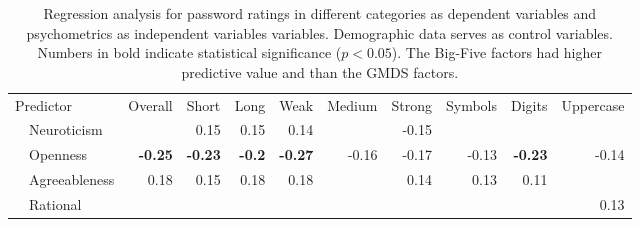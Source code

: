 \begin{table*}%
  \small
  \centering
  \caption{Regression analysis for password ratings in different categories as dependent variables and psychometrics as independent variables variables. Demographic data serves as control variables. Numbers in bold indicate statistical significance ($p<0.05$). The Big-Five factors had higher predictive value and than the GMDS factors.}
    \resizebox{\linewidth}{!}
{
\begin{tabular}{rl|r|rr|rrr|rrr}
    \multicolumn{2}{l|}{Predictor} & \multicolumn{1}{l|}{Overall} & \multicolumn{1}{l}{Short} & \multicolumn{1}{l|}{Long} & \multicolumn{1}{l}{Weak} & \multicolumn{1}{l}{Medium} & \multicolumn{1}{l|}{Strong} & \multicolumn{1}{l}{Symbols} & \multicolumn{1}{l}{Digits} & \multicolumn{1}{l}{Uppercase} \\
\cmidrule{3-11}    \rowcolor[rgb]{ .718,  .871,  .91} \multicolumn{1}{l}{Big Five} & Neuroticism & \cellcolor[rgb]{ 1,  1,  1}  & \cellcolor[rgb]{ .949,  .91,  .518} 0.15 & \cellcolor[rgb]{ .949,  .91,  .518} 0.15 & \cellcolor[rgb]{ .969,  .914,  .518} 0.14 & \cellcolor[rgb]{ 1,  1,  1}  & \cellcolor[rgb]{ .98,  .627,  .459} -0.15 & \cellcolor[rgb]{ 1,  1,  1}  & \cellcolor[rgb]{ 1,  1,  1}  & \cellcolor[rgb]{ 1,  1,  1}  \\
    \rowcolor[rgb]{ .718,  .871,  .91}   & Openness & \cellcolor[rgb]{ .976,  .518,  .439} \textbf{-0.25} & \cellcolor[rgb]{ .976,  .541,  .443} \textbf{-0.23} & \cellcolor[rgb]{ .98,  .573,  .447} \textbf{-0.2} & \cellcolor[rgb]{ .976,  .498,  .435} \textbf{-0.27} & \cellcolor[rgb]{ .98,  .616,  .459} -0.16 & \cellcolor[rgb]{ .98,  .604,  .455} -0.17 & \cellcolor[rgb]{ .984,  .647,  .463} -0.13 & \cellcolor[rgb]{ .976,  .541,  .443} \textbf{-0.23} & \cellcolor[rgb]{ .984,  .639,  .463} -0.14 \\
    \rowcolor[rgb]{ .718,  .871,  .91}   & Agreeableness & \cellcolor[rgb]{ .898,  .894,  .514} 0.18 & \cellcolor[rgb]{ .949,  .91,  .518} 0.15 & \cellcolor[rgb]{ .898,  .894,  .514} 0.18 & \cellcolor[rgb]{ .898,  .894,  .514} 0.18 & \cellcolor[rgb]{ 1,  1,  1}  & \cellcolor[rgb]{ .969,  .914,  .518} 0.14 & \cellcolor[rgb]{ .984,  .918,  .518} 0.13 & \cellcolor[rgb]{ .996,  .91,  .514} 0.11 & \cellcolor[rgb]{ 1,  1,  1}  \\
    \rowcolor[rgb]{ .988,  .835,  .706} \multicolumn{1}{l}{GDMS} & Rational & \cellcolor[rgb]{ 1,  1,  1}  & \cellcolor[rgb]{ 1,  1,  1}  & \cellcolor[rgb]{ 1,  1,  1}  & \cellcolor[rgb]{ 1,  1,  1}  & \cellcolor[rgb]{ 1,  1,  1}  & \cellcolor[rgb]{ 1,  1,  1}  & \cellcolor[rgb]{ 1,  1,  1}  & \cellcolor[rgb]{ 1,  1,  1}  & \cellcolor[rgb]{ .984,  .918,  .518} 0.13 \\

\end{tabular}}
\end{table*}
